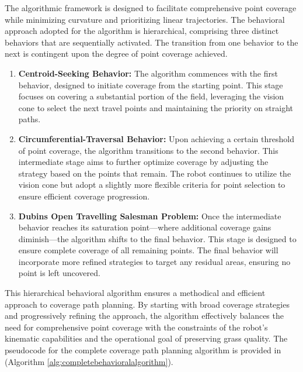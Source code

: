 The algorithmic framework is designed to facilitate comprehensive point coverage while minimizing curvature and prioritizing linear trajectories. The behavioral approach adopted for the algorithm is hierarchical, comprising three distinct behaviors that are sequentially activated. The transition from one behavior to the next is contingent upon the degree of point coverage achieved.

\begin{enumerate}
    \item \textbf{Centroid-Seeking Behavior: }The algorithm commences with the first behavior, designed to initiate coverage from the starting point. This stage focuses on covering a substantial portion of the field, leveraging the vision cone to select the next travel points and maintaining the priority on straight paths.
    
    \item \textbf{Circumferential-Traversal Behavior:} Upon achieving a certain threshold of point coverage, the algorithm transitions to the second behavior. This intermediate stage aims to further optimize coverage by adjusting the strategy based on the points that remain. The robot continues to utilize the vision cone but adopt a slightly more flexible criteria for point selection to ensure efficient coverage progression.
    
    \item \textbf{Dubins Open Travelling Salesman Problem:} Once the intermediate behavior reaches its saturation point—where additional coverage gains diminish—the algorithm shifts to the final behavior. This stage is designed to ensure complete coverage of all remaining points. The final behavior will incorporate more refined strategies to target any residual areas, ensuring no point is left uncovered.
\end{enumerate}



This hierarchical behavioral algorithm ensures a methodical and efficient approach to coverage path planning. By starting with broad coverage strategies and progressively refining the approach, the algorithm effectively balances the need for comprehensive point coverage with the constraints of the robot's kinematic capabilities and the operational goal of preserving grass quality. The pseudocode for the complete coverage path planning algorithm is provided in (Algorithm \autoref{alg:completebehavioralalgorithm}). 

\vspace{3mm}   

